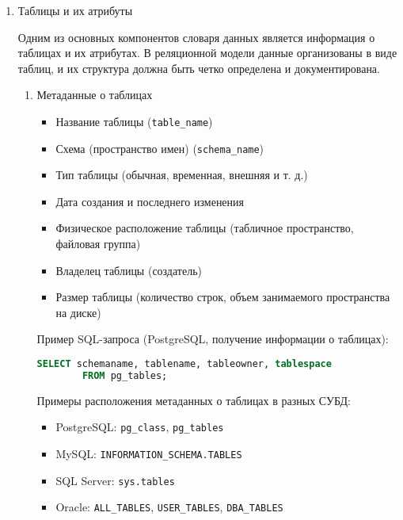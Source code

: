 \begin{enumerate}

    \item Таблицы и их атрибуты \autocites[§51.11]{PostgreSQLdocc51}[§28.3.38]{Mysqldoc1}{MicrosoftLearnSQLserver}

    Одним из основных компонентов словаря данных является информация о таблицах и их атрибутах. В реляционной модели данные организованы в виде таблиц, и их структура должна быть четко определена и документирована.

    \begin{enumerate}
        \item Метаданные о таблицах

        \begin{itemize}
            \item Название таблицы (\texttt{table\_name})
            \item Схема (пространство имен) (\texttt{schema\_name})
            \item Тип таблицы (обычная, временная, внешняя и т. д.)
            \item Дата создания и последнего изменения
            \item Физическое расположение таблицы (табличное пространство, файловая группа)
            \item Владелец таблицы (создатель)
            \item Размер таблицы (количество строк, объем занимаемого пространства на диске)
        \end{itemize}

        Пример SQL-запроса (PostgreSQL, получение информации о таблицах):
        \begin{lstlisting}[language=SQL]
        SELECT schemaname, tablename, tableowner, tablespace 
        FROM pg_tables;
        \end{lstlisting}

        Примеры расположения метаданных о таблицах в разных СУБД:
        \begin{itemize}
            \item PostgreSQL: \texttt{pg\_class}, \texttt{pg\_tables}
            \item MySQL: \texttt{INFORMATION\_SCHEMA.TABLES}
            \item SQL Server: \texttt{sys.tables}
            \item Oracle: \texttt{ALL\_TABLES}, \texttt{USER\_TABLES}, \texttt{DBA\_TABLES}
        \end{itemize}


\end{enumerate}
\end{enumerate}
